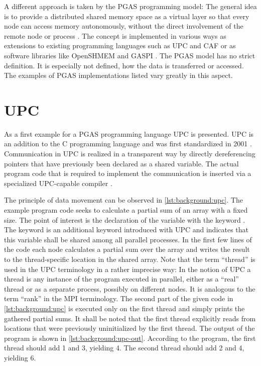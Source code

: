 A different approach is taken by the \acf{PGAS} programming model: The general idea is to provide a distributed shared memory space as a virtual layer so that every node can access memory autonomously, \ie without the direct involvement of the remote node or process \cite[ch.~2.1.3]{diss-end}. The concept is implemented in various ways as extensions to existing programming languages such as \ac{UPC} and \ac{CAF} or as software libraries like \ac{OpenSHMEM} and \ac{GASPI} \cite[p.~9]{diss-end}. The \ac{PGAS} model has no strict definition. It is especially not defined, how the data is transferred or accessed. The examples of \ac{PGAS} implementations listed vary greatly in this aspect.  

\section{\acl{UPC}}

As a first example for a \ac{PGAS} programming language \ac{UPC} is presented. \Ac{UPC} is an addition to the C programming language and was first standardized in 2001 \cite[Preface]{upc}. Communication in \ac{UPC} is realized in a transparent way by directly dereferencing pointers that have previously been declared as a shared variable. The actual program code that is required to implement the communication is inserted via a specialized \ac{UPC}-capable compiler \cite[ch.~1.1]{upc}.

The principle of data movement can be observed in \autoref{lst:background:upc}. The example program code seeks to calculate a partial sum of an array with a fixed size. The point of interest is the declaration of the variable  with the keyword . The  keyword is an additional keyword introduced with \ac{UPC} and indicates that this variable shall be shared among all parallel processes. In the first few lines of the code each node calculates a partial sum over the array and writes the result to the thread-specific location in the shared array. Note that the term \enquote{thread} is used in the \ac{UPC} terminology in a rather imprecise way: In the notion of \ac{UPC} a thread is any instance of the program executed in parallel, either as a \enquote{real} thread or as a separate process, possibly on different nodes. It is analogous to the term \enquote{rank} in the \ac{MPI} terminology. The second part of the given code in \autoref{lst:background:upc} is executed only on the first thread and simply prints the gathered partial sums. It shall be noted that the first thread explicitly reads from locations that were previously uninitialized by the first thread. The output of the program is shown in \autoref{lst:background:upc-out}. According to the program, the first thread should add 1 and 3, yielding 4. The second thread should add 2 and 4, yielding 6. 

